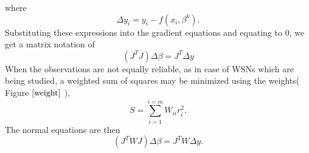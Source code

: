 \documentclass[a4paper,10pt]{report}
\begin{document}
where
\begin{equation}
 \Delta y_i=y_i- f(x_i, \beta^k).
\end{equation}
Substituting these expressions into the gradient equations and equating to $0$, we get a matrix notation of
\begin{equation}
    \left(J^TJ\right)\Delta  \beta=J^T\Delta y
\end{equation}
When the observations are not equally reliable, as in case of WSNs which are being studied, a weighted sum of squares may be minimized
using the weights( Figure $\ref{weight}$ ),
\begin{equation}
    S=\sum_{i=1}^{i=m}W_{ii}r_i^2.
\end{equation}
The normal equations are then
\begin{equation}
    \left(J^TWJ\right)\Delta  \beta=J^TW\Delta y.
\end{equation}
\end{document}
